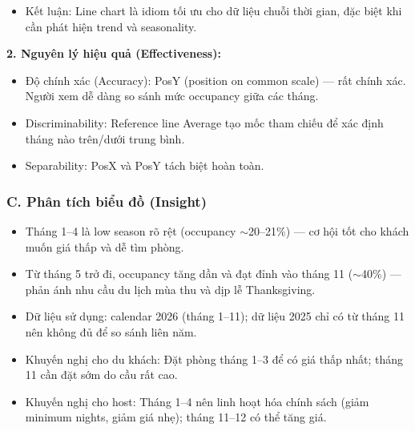 \begin{itemize}
\begin{itemize}
        \item Ưu tiên 3 -- Reference Line (Average): Reference line ngang tại mức trung bình ($\sim$30\%) là channel bổ trợ giúp người xem định vị nhanh các tháng vượt/dưới ngưỡng bình thường mà không cần đọc chính xác giá trị trục Y. Đây là annotation tĩnh (không encode data mới) nhưng tăng đáng kể khả năng thực hiện action Locate Extremes --- xác định tháng cao điểm và thấp điểm một cách tức thì. Theo phân loại Munzner, đây là dạng derived encoding bổ trợ cho channel chính thay vì thay thế nó.
    \end{itemize}
    \item Kết luận: Line chart là idiom tối ưu cho dữ liệu chuỗi thời gian, đặc biệt khi cần phát hiện trend và seasonality.
\end{itemize}

\textbf{2. Nguyên lý hiệu quả (Effectiveness):}

\begin{itemize}
    \item Độ chính xác (Accuracy): PosY (position on common scale) --- rất chính xác. Người xem dễ dàng so sánh mức occupancy giữa các tháng.
    \item Discriminability: Reference line Average tạo mốc tham chiếu để xác định tháng nào trên/dưới trung bình.
    \item Separability: PosX và PosY tách biệt hoàn toàn.
\end{itemize}

\subsubsection*{C. Phân tích biểu đồ (Insight)}

\begin{itemize}
    \item Tháng 1--4 là low season rõ rệt (occupancy $\sim$20--21\%) --- cơ hội tốt cho khách muốn giá thấp và dễ tìm phòng.
    \item Từ tháng 5 trở đi, occupancy tăng dần và đạt đỉnh vào tháng 11 ($\sim$40\%) --- phản ánh nhu cầu du lịch mùa thu và dịp lễ Thanksgiving.
    \item Dữ liệu sử dụng: calendar 2026 (tháng 1--11); dữ liệu 2025 chỉ có từ tháng 11 nên không đủ để so sánh liên năm.
    \item Khuyến nghị cho du khách: Đặt phòng tháng 1--3 để có giá thấp nhất; tháng 11 cần đặt sớm do cầu rất cao.
    \item Khuyến nghị cho host: Tháng 1--4 nên linh hoạt hóa chính sách (giảm minimum nights, giảm giá nhẹ); tháng 11--12 có thể tăng giá.
\end{itemize}

